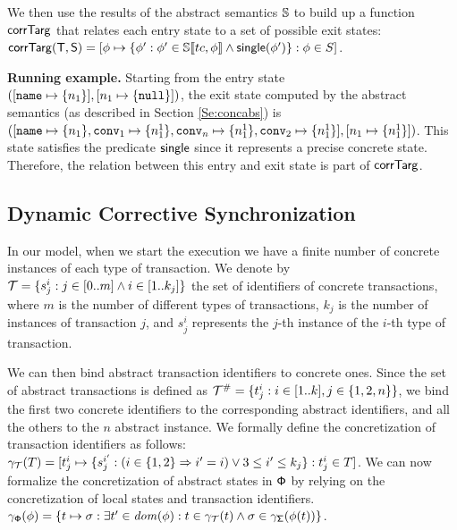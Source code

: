 We then use the results of the abstract semantics $\mathbb{S}$ to build up a function 
$\mathsf{corrTarg}$
that relates each entry state to a set of possible exit states:
\footnotesize
$
\mathsf{corrTarg}(\mathsf{T}, \mathsf{S}) =[\phi \mapsto \{ \phi': \phi' \in \mathbb{S}\llbracket tc, \phi \rrbracket \land
\mathsf{single}(\phi')\} : \phi \in S]
$.
\normalsize

\noindent \textbf{Running example.} Starting from the entry state $([\mathtt{name} \mapsto \{n_1\}], [n_1 \mapsto \{\mathtt{null}\}])$, the exit state computed by the abstract semantics (as described in Section \ref{Se:concabs}) is
$([\mathtt{name} \mapsto \{n_1\}, \mathtt{conv}_1 \mapsto \{n^1_1\}, \mathtt{conv}_n \mapsto \{n^1_1\}, \mathtt{conv}_2 \mapsto \{n^1_1\}], [n_1 \mapsto \{n^1_1\}])$. This state satisfies the predicate $\mathsf{single}$ since it represents a precise concrete state. Therefore, the relation between this entry and exit state is part of $\mathsf{corrTarg}$.
	
\subsection{Dynamic Corrective Synchronization}
\label{sec:dynamicwarping}
In our model, when we start the execution we have a finite number of concrete instances of each type of transaction. We denote by $\concretetransactions = \{s^i_j : j \in [0..m] \land i \in [1..k_j]\}$ the set of identifiers of concrete transactions, where $m$ is the number of different types of transactions, $k_j$ is the number of instances of transaction $j$, and $s^i_j$ represents the $j$-th instance of the $i$-th type of transaction.

We can then bind abstract transaction identifiers to concrete ones. Since the set of abstract transactions is defined as $\abstracttransactions = \{t^i_j : i \in [1..k], j \in \{1, 2, n\}\}$, we bind the first two concrete identifiers to the corresponding abstract identifiers, and all the others to the $n$ abstract instance. We formally define the concretization of transaction identifiers as follows:
\footnotesize
$
\gamma_{\concretetransactions}(T) =
[
t^i_j \mapsto 
\{
s^{i'}_j : (i \in \{1, 2\} \Rightarrow i'=i) \lor 3\leq i' \leq k_j
\} : t^i_j \in T
]
$.
\normalsize
We can now formalize the concretization of abstract states in $\mathsf{\mathsf{\Phi}}$ by relying on the concretization of local states and transaction identifiers.
%
\footnotesize
$
\gamma_\multistate(\phi) = \{t \mapsto \sigma : \exists t' \in \dom{\phi} : t \in \gamma_{\concretetransactions}(t) \land \sigma \in \gamma_{\state}(\phi(t))\}
$.
\normalsize

